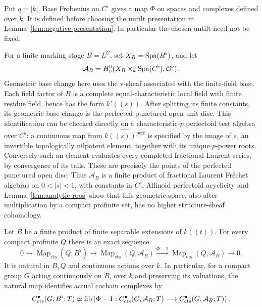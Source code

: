 Put \(q=|k|\).  Base Frobenius on \(C^\flat\) gives a map
\(\Phi\) on spaces and complexes defined over \(k\).  It is
defined before choosing the untilt presentation in
Lemma~\ref{lem:negative-presentation}.  In particular the chosen
untilt need not be fixed.

For a finite marking stage \(B=L^U\), set
\(X_B=\operatorname{Spa}(B^\flat)\), and let
\[
 \mathcal A_B
   =H^0_v(X_B\times_k\operatorname{Spa}(C^\flat),\mathcal O^\flat).
\]
Geometric base change here uses the v-sheaf associated with the
finite-field base.  Each field factor of \(B\) is a complete
equal-characteristic local field with finite residue field, hence
has the form \(k'((s))\).
After splitting its finite constants, its geometric base change
is the perfected punctured open unit disc.  This identification
can be checked directly on a characteristic-\(p\) perfectoid test
algebra over \(C^\flat\): a continuous map from
\(\widehat{k((s))^{\mathrm{perf}}}\) is specified by the image of
\(s\), an invertible topologically nilpotent element, together
with its unique \(p\)-power roots.  Conversely such an element
evaluates every completed fractional Laurent series, by
convergence of its tails.  These are precisely the points of the
perfected punctured open disc.  Thus \(\mathcal A_B\)
is a finite product of fractional Laurent Fr\'echet algebras on
\(0<|s|<1\), with constants in \(C^\flat\).
Affinoid perfectoid acyclicity and
Lemma~\ref{lem:analytic-roos} show that this geometric space, also
after multiplication by a compact profinite set, has no higher
structure-sheaf cohomology.

\begin{lemma}
\label{lem:frobenius-descent}
Let \(B\) be a finite product of finite separable extensions of
\(k((t))\).  For every compact profinite \(Q\) there is an exact
sequence
\begin{equation}
 0\longrightarrow
 \operatorname{Map}_{\mathrm{cts}}(Q,B^\flat)
 \longrightarrow
 \operatorname{Map}_{\mathrm{cts}}(Q,\mathcal A_B)
 \xrightarrow{\Phi-1}
 \operatorname{Map}_{\mathrm{cts}}(Q,\mathcal A_B)
 \longrightarrow0.
 \label{eq:analytic-frobenius-exact}
\end{equation}
It is natural in \(B,Q\) and continuous actions over \(k\).
In particular, for a compact group \(G\) acting continuously on
\(B\), over \(k\) and preserving its valuations, the natural map
identifies actual cochain complexes by
\begin{equation}
 C^\bullet_{\mathrm{cts}}(G,B^\flat;T)
 \simeq
 \operatorname{fib}\left(
 \Phi-1:C^\bullet_{\mathrm{cts}}(G,\mathcal A_B;T)
               \longrightarrow C^\bullet_{\mathrm{cts}}(G,\mathcal A_B;T)\right).
 \label{eq:analytic-frobenius-cochains}
\end{equation}
\end{lemma}

